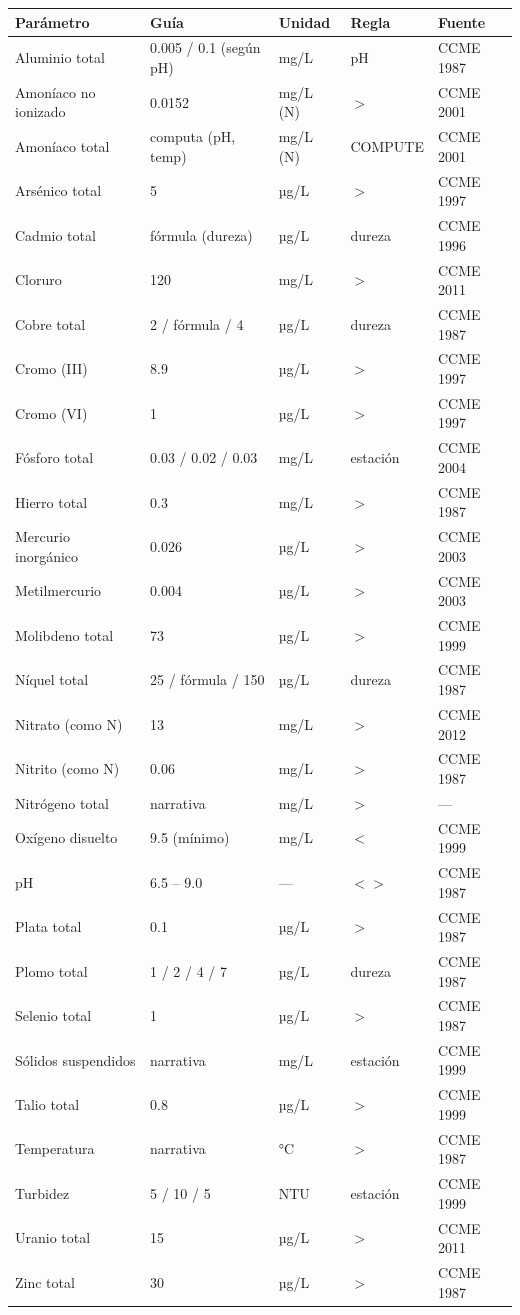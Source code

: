 \documentclass[11pt,a4paper]{article}
\begin{document}
\begin{center}\footnotesize\renewcommand{\arraystretch}{1.22}
\begin{longtable}{@{}p{4.0cm} p{3.0cm} p{1.7cm} p{2.5cm} p{2.2cm}@{}}
\toprule \textbf{Parámetro} & \textbf{Guía} & \textbf{Unidad} & \textbf{Regla} & \textbf{Fuente} \\ \midrule\endhead
Aluminio total & 0.005 / 0.1 (según pH) & mg/L & pH & CCME 1987 \\
Amoníaco no ionizado & 0.0152 & mg/L (N) & $>$ & CCME 2001 \\
Amoníaco total & computa (pH, temp) & mg/L (N) & COMPUTE & CCME 2001 \\
Arsénico total & 5 & µg/L & $>$ & CCME 1997 \\
Cadmio total & fórmula (dureza) & µg/L & dureza & CCME 1996 \\
Cloruro & 120 & mg/L & $>$ & CCME 2011 \\
Cobre total & 2 / fórmula / 4 & µg/L & dureza & CCME 1987 \\
Cromo (III) & 8.9 & µg/L & $>$ & CCME 1997 \\
Cromo (VI) & 1 & µg/L & $>$ & CCME 1997 \\
Fósforo total & 0.03 / 0.02 / 0.03 & mg/L & estación & CCME 2004 \\
Hierro total & 0.3 & mg/L & $>$ & CCME 1987 \\
Mercurio inorgánico & 0.026 & µg/L & $>$ & CCME 2003 \\
Metilmercurio & 0.004 & µg/L & $>$ & CCME 2003 \\
Molibdeno total & 73 & µg/L & $>$ & CCME 1999 \\
Níquel total & 25 / fórmula / 150 & µg/L & dureza & CCME 1987 \\
Nitrato (como N) & 13 & mg/L & $>$ & CCME 2012 \\
Nitrito (como N) & 0.06 & mg/L & $>$ & CCME 1987 \\
Nitrógeno total & narrativa & mg/L & $>$ & --- \\
Oxígeno disuelto & 9.5 (mínimo) & mg/L & $<$ & CCME 1999 \\
pH & 6.5 -- 9.0 & --- & $<>$ & CCME 1987 \\
Plata total & 0.1 & µg/L & $>$ & CCME 1987 \\
Plomo total & 1 / 2 / 4 / 7 & µg/L & dureza & CCME 1987 \\
Selenio total & 1 & µg/L & $>$ & CCME 1987 \\
Sólidos suspendidos & narrativa & mg/L & estación & CCME 1999 \\
Talio total & 0.8 & µg/L & $>$ & CCME 1999 \\
Temperatura & narrativa & °C & $>$ & CCME 1987 \\
Turbidez & 5 / 10 / 5 & NTU & estación & CCME 1999 \\
Uranio total & 15 & µg/L & $>$ & CCME 2011 \\
Zinc total & 30 & µg/L & $>$ & CCME 1987 \\ \bottomrule
\end{longtable}
\end{center}
\end{document}
